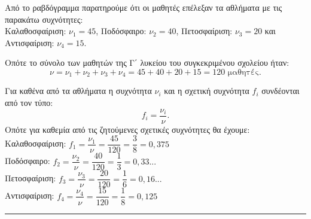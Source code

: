 
    \begin{alist}
        \item Από το ραβδόγραμμα παρατηρούμε ότι οι μαθητές επέλεξαν τα αθλήματα με τις παρακάτω συχνότητες:
        \\Καλαθοσφαίριση: $\nu_1=45$, Ποδόσφαιρο: $\nu_2=40$, Πετοσφαίριση: $\nu_3=20$ και Αντισφαίριση: $\nu_4=15$.
        \par Οπότε το σύνολο των μαθητών της Γ΄ λυκείου του συγκεκριμένου σχολείου ήταν:
        \[
            \nu=\nu_1+\nu_2+\nu_3+\nu_4=45+40+20+15=120 \text{ μαθητές.}
        \]
        \item Για καθένα από τα αθλήματα η συχνότητα $\nu_i$ και η σχετική συχνότητα $f_i$ συνδέονται από τον τύπο:
        \[
            f_i=\frac{\nu_i}{\nu}.
        \]
        Οπότε για καθεμία από τις ζητούμενες σχετικές συχνότητες θα έχουμε:
        \\Καλαθοσφαίριση: $f_1=\dfrac{\nu_1}{\nu}=\dfrac{45}{120}=\dfrac{3}{8}=0,375$
        \\Ποδόσφαιρο: $f_2=\dfrac{\nu_2}{\nu}=\dfrac{40}{120}=\dfrac{1}{3}=0,33...$
        \\Πετοσφαίριση: $f_3=\dfrac{\nu_3}{\nu}=\dfrac{20}{120}=\dfrac{1}{6}=0,16...$
        \\Αντισφαίριση: $f_4=\dfrac{\nu_4}{\nu}=\dfrac{15}{120}=\dfrac{1}{8}=0,125$
    \end{alist}
\vspace{6mm}
\noindent\rule{\textwidth}{0.4pt}
\vspace{6mm}

